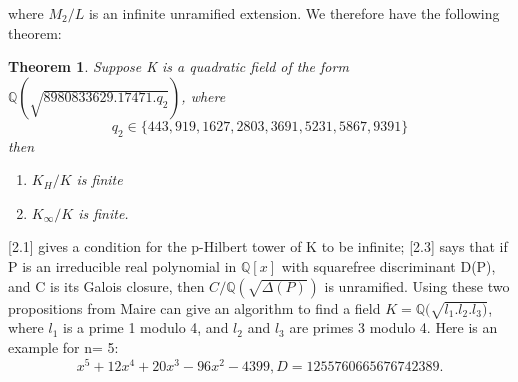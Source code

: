 \documentclass[preprint,12pt,reqno]{elsarticle}
\newtheorem{theorem}{Theorem}
\begin{document}
where $M_2/L$ is an infinite unramified extension. We therefore have the following theorem:
\begin{theorem}
    Suppose K is a quadratic field of the form $\mathbb{Q}(\sqrt{8980833629.17471.q_2})$, where 
    \begin{equation}
        q_2\in\{443,919,1627,2803,3691,5231,5867,9391\}
    \end{equation}
    then \begin{enumerate}
        \item $K_H/K$ is finite
        \item $K_\infty/K$ is finite.
    \end{enumerate}
\end{theorem}
\cite{MAIR}[2.1] gives a condition for the p-Hilbert tower of K to be infinite; \cite{MAIR}[2.3] says that if P is an irreducible real polynomial in $\mathbb{Q}[x]$ with squarefree discriminant D(P), and C is its Galois closure, then $C/\mathbb{Q}(\sqrt{\Delta(P)})$ is unramified.
\newline
Using these two propositions from Maire can give an algorithm to find a field $K=\mathbb{Q}(\sqrt{l_1.l_2.l_3)}$, where $l_1$ is a prime 1 modulo 4, and $l_2$ and $l_3$ are primes 3 modulo 4. 
\newline
Here is an example for n= 5:
\begin{equation}
    x^5 + 12x^4 + 20x^3 - 96x^2 - 4399, D=1255760665676742389.
\end{equation}
\end{document}
